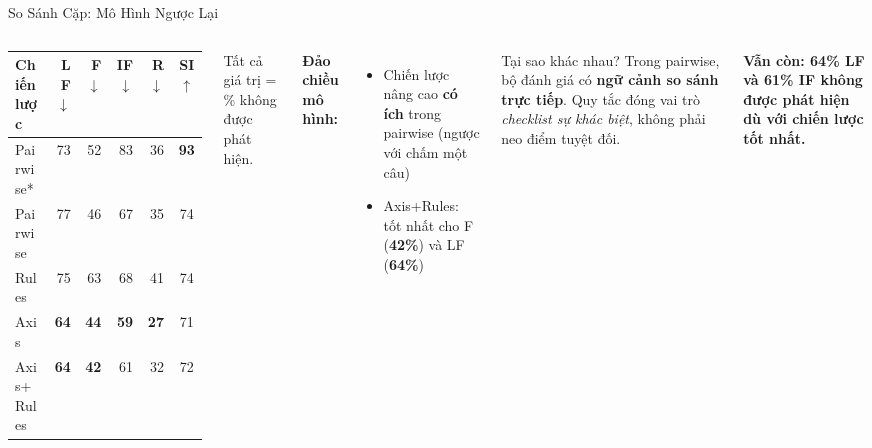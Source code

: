 \documentclass[aspectratio=169,10pt]{beamer}
\newcommand{\good}[1]{\textcolor{green!60!black}{\textbf{#1}}}
\newcommand{\bad}[1]{\textcolor{aclred}{\textbf{#1}}}
\begin{document}
\begin{frame}{So Sánh Cặp: Mô Hình Ngược Lại}
  \begin{columns}[T]
      \small
      \begin{tabular}{lrrrrc}
        \toprule
        \textbf{Chiến lược} & \textbf{LF}$\downarrow$ & \textbf{F}$\downarrow$ & \textbf{IF}$\downarrow$ & \textbf{R}$\downarrow$ & \textbf{SI}$\uparrow$ \\
        \midrule
        Pairwise*   & 73 & 52 & 83 & 36 & \good{93} \\
        Pairwise    & 77 & 46 & 67 & 35 & 74 \\
        Rules       & 75 & 63 & 68 & 41 & 74 \\
        \rowcolor{acllightblue}
        Axis        & \good{64} & \good{44} & \good{59} & \good{27} & 71 \\
        Axis+Rules  & \good{64} & \good{42} & 61 & 32 & 72 \\
        \bottomrule
      \end{tabular}
      \vspace{0.3em}
      \small Tất cả giá trị = \% không được phát hiện.

      \textbf{Đảo chiều mô hình:}
      \begin{itemize}
        \item Chiến lược nâng cao \good{có ích} trong pairwise (ngược với chấm một câu)
        \item Axis+Rules: tốt nhất cho F (\good{42\%}) và LF (\good{64\%})
      \end{itemize}

      \vspace{0.4em}
      \begin{block}{Tại sao khác nhau?}
        Trong pairwise, bộ đánh giá có \textbf{ngữ cảnh so sánh trực tiếp}. Quy tắc đóng vai trò \emph{checklist sự khác biệt}, không phải neo điểm tuyệt đối.
      \end{block}

      \vspace{0.3em}
      \small \bad{Vẫn còn: 64\% LF và 61\% IF không được phát hiện dù với chiến lược tốt nhất.}
  \end{columns}
\end{frame}
\end{document}
